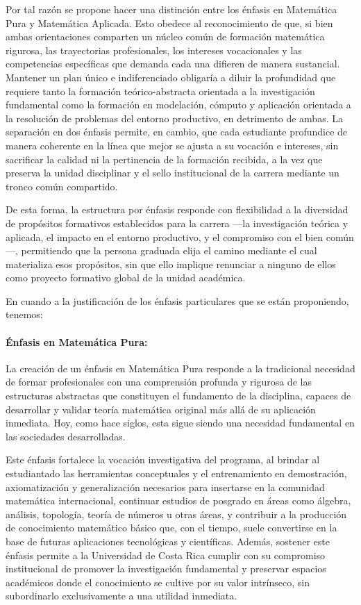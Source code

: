 \begin{refsection}
Por tal razón se propone hacer una distinción entre los énfasis en Matemática Pura y Matemática Aplicada. Esto obedece al reconocimiento de que, si bien ambas orientaciones comparten un núcleo común de formación matemática rigurosa, las trayectorias profesionales, los intereses vocacionales y las competencias específicas que demanda cada una difieren de manera sustancial. Mantener un plan único e indiferenciado obligaría a diluir la profundidad que requiere tanto la formación teórico-abstracta orientada a la investigación fundamental como la formación en modelación, cómputo y aplicación orientada a la resolución de problemas del entorno productivo, en detrimento de ambas. La separación en dos énfasis permite, en cambio, que cada estudiante profundice de manera coherente en la línea que mejor se ajusta a su vocación e intereses, sin sacrificar la calidad ni la pertinencia de la formación recibida, a la vez que preserva la unidad disciplinar y el sello institucional de la carrera mediante un tronco común compartido. 

De esta forma, la estructura por énfasis responde con flexibilidad a la diversidad de propósitos formativos establecidos para la carrera —la investigación teórica y aplicada, el impacto en el entorno productivo, y el compromiso con el bien común—, permitiendo que la persona graduada elija el camino mediante el cual materializa esos propósitos, sin que ello implique renunciar a ninguno de ellos como proyecto formativo global de la unidad académica.

En cuando a la justificación de los énfasis particulares que se están proponiendo, tenemos:

\paragraph{Énfasis en Matemática Pura:}

La creación de un énfasis en Matemática Pura responde a la tradicional necesidad de formar profesionales con una comprensión profunda y rigurosa de las estructuras abstractas que constituyen el fundamento de la disciplina, capaces de desarrollar y validar teoría matemática original más allá de su aplicación inmediata. Hoy, como hace siglos, esta sigue siendo una necesidad fundamental en las sociedades desarrolladas.

Este énfasis fortalece la vocación investigativa del programa, al brindar al estudiantado las herramientas conceptuales y el entrenamiento en demostración, axiomatización y generalización necesarios para insertarse en la comunidad matemática internacional, continuar estudios de posgrado en áreas como álgebra, análisis, topología, teoría de números u otras áreas, y contribuir a la producción de conocimiento matemático básico que, con el tiempo, suele convertirse en la base de futuras aplicaciones tecnológicas y científicas. Además, sostener este énfasis permite a la Universidad de Costa Rica cumplir con su compromiso institucional de promover la investigación fundamental y preservar espacios académicos donde el conocimiento se cultive por su valor intrínseco, sin subordinarlo exclusivamente a una utilidad inmediata.


\end{refsection}
